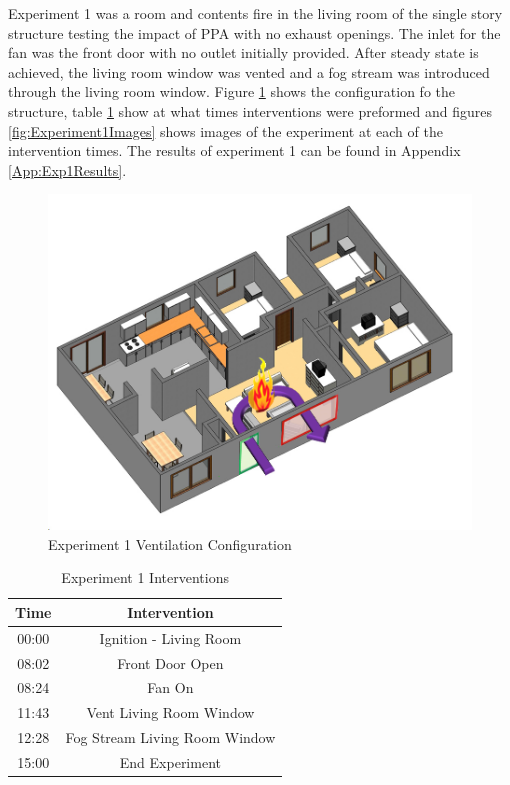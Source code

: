 \documentclass{article}
\begin{document}
Experiment 1 was a room and contents fire in the living room of the single story structure testing the impact of PPA with no exhaust openings. The inlet for the fan was the front door with no outlet initially provided. After steady state is achieved, the living room window was vented and a fog stream was introduced through the living room window. Figure \ref{fig:Exp1VentConfig} shows the configuration fo the structure, table \ref{Table:Exp1Interventions} show at what times interventions were preformed and figures \ref{fig:Experiment1Images} shows images of the experiment at each of the intervention times. The results of experiment 1 can be found in Appendix \ref{App:Exp1Results}.

\begin{figure}[h!]
	\centering
	\includegraphics[width=5in]{0_Images/FireExperiments/Single_Story/Experiment_1.jpg}
	\caption{Experiment 1 Ventilation Configuration}
	\label{fig:Exp1VentConfig}
\end{figure}

\begin{table}[H]
	\centering
	\caption{Experiment 1 Interventions}
	\begin{tabular}{|c|c|} 
		\hline
		Time & Intervention \\ \hline \hline
		00:00 & Ignition - Living Room \\ \hline
		08:02 & Front Door Open \\ \hline
		08:24 & Fan On \\ \hline
		11:43 & Vent Living Room Window \\ \hline
		12:28 & Fog Stream Living Room Window \\ \hline
		15:00 & End Experiment\\ \hline
	\end{tabular}
	\label{Table:Exp1Interventions}
\end{table}
\end{document}
